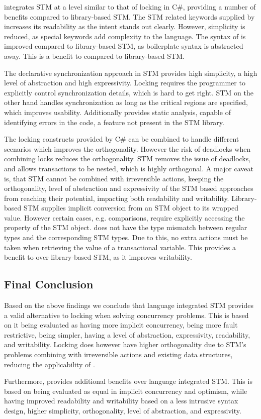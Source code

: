 \stmname integrates \ac{STM} at a level similar to that of locking in C\#, providing a number of benefits compared to library-based \ac{STM}. The \ac{STM} related keywords supplied by \stmname increases its readability as the intent stands out clearly. However, simplicity is  reduced, as special keywords add complexity to the language. The syntax of \stmname is improved compared to library-based \ac{STM}, as boilerplate syntax is abstracted away. This is a benefit to \stmname compared to library-based \ac{STM}.

The declarative synchronization approach in \ac{STM} provides high simplicity, a high level of abstraction and high expressivity. Locking requires the programmer to explicitly control synchronization details, which is hard to get right. \ac{STM} on the other hand handles synchronization as long as the critical regions are specified, which improves usability. Additionally \stmname provides static analysis, capable of identifying errors in the code, a feature not present in the \ac{STM} library.

The locking constructs provided by C\#  can be  combined to handle different scenarios which improves the orthogonality. However the risk of deadlocks when combining locks reduces the orthogonality. \ac{STM} removes the issue of deadlocks, and allows transactions to be nested, which is highly orthogonal. A major caveat is, that \ac{STM} cannot be combined with irreversible actions, keeping the orthogonality, level of abstraction and expressivity of the \ac{STM} based approaches from reaching their potential, impacting both readability and writability. Library-based \ac{STM} supplies implicit conversion from an \ac{STM} object to its wrapped value. However certain cases, e.g. comparisons, require explicitly accessing the  property of the \ac{STM} object. \stmname does not have the type mismatch between regular types and the corresponding \ac{STM} types. Due to this, no extra actions must be taken when retrieving the value of a transactional variable. This provides a benefit to \stmname over library-based \ac{STM}, as it improves writability.

\subsection{Final Conclusion}\label{subsec:final_conclusion}
Based on the above findings we conclude that language integrated \ac{STM} provides a valid alternative to locking when solving concurrency problems. This is based on it being evaluated as having more implicit concurrency, being more fault restrictive, being simpler, having a level of abstraction, expressivity, readability, and writability. Locking does however have higher orthogonality due to \ac{STM}’s problems combining with irreversible actions and existing data structures, reducing the applicability of \stmname.

Furthermore, \stmname provides additional benefits over language integrated \ac{STM}. This is based on being evaluated as equal in implicit concurrency and optimism, while having improved readability and writability based on a less intrusive syntax design, higher simplicity, orthogonality, level of abstraction, and expressivity.

\worksheetend
